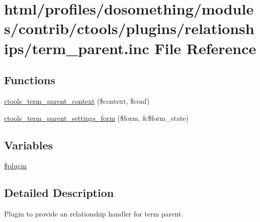 \hypertarget{relationships_2term__parent_8inc}{
\section{html/profiles/dosomething/modules/contrib/ctools/plugins/relationships/term\_\-parent.inc File Reference}
\label{relationships_2term__parent_8inc}
}
\subsection*{Functions}
\begin{DoxyCompactItemize}
\item 
\hyperlink{relationships_2term__parent_8inc_ab8a342117f0788bec94767974ec73484}{ctools\_\-term\_\-parent\_\-context} (\$context, \$conf)
\item 
\hyperlink{relationships_2term__parent_8inc_a05b2f9f6619b4ced6b6176b7de6c2940}{ctools\_\-term\_\-parent\_\-settings\_\-form} (\$form, \&\$form\_\-state)
\end{DoxyCompactItemize}
\subsection*{Variables}
\begin{DoxyCompactItemize}
\item 
\hyperlink{relationships_2term__parent_8inc_ada8a7130088351710bb02ed622d6bf65}{\$plugin}
\end{DoxyCompactItemize}


\subsection{Detailed Description}
Plugin to provide an relationship handler for term parent. 

